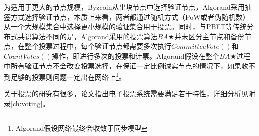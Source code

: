 为适用于更大的节点规模，Byzcoin从出块节点中选择验证节点\cite{kogias2016enhancing}，Algorand采用抽签方式选择验证节点\cite{gilad2017algorand}，本质上来看，两者都通过随机方式（PoW或者伪随机数）从一个大规模集合中选择更小规模的验证集合用于投票。同时，与PBFT等传统分布式共识算法不同的是，Algorand采用的投票算法$BA\bigstar$并未区分主节点和备份节点，在整个投票过程中，每个验证节点都需要多次执行$CommitteeVote()$和$CountVotes()$操作，即进行多次的投票和计票。Algorand假设在整个$BA\bigstar$过程中所有验证节点不会改变投票选择，在保证一定比例诚实节点的情况下，如果收不到足够的投票则问题一定出在网络上\footnote{Algorand假设网络最终会收敛于同步模型}。%

关于投票的研究有很多，论文\cite{kiayias2002self}指出电子投票系统需要满足若干特性，详细分析见附录\ref{ch:voting}。





